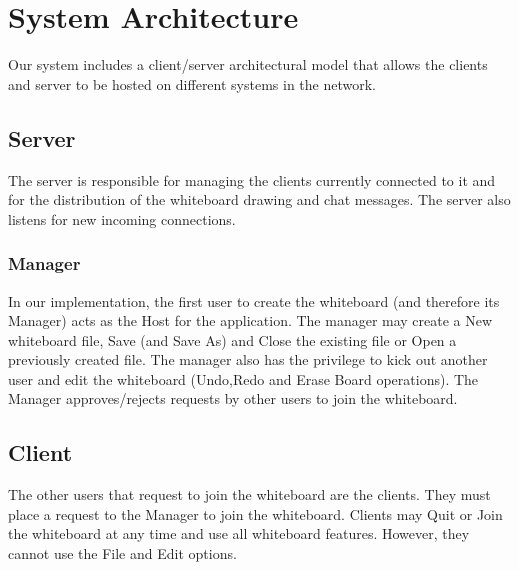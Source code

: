 \chapter{System Architecture}
Our system includes a client/server architectural model that allows the clients and server to be hosted on different systems in the network.
\section{Server}
The server is responsible for managing the clients currently connected to it and for the distribution of the whiteboard drawing and chat messages. The server also listens for new incoming connections.
\subsection{Manager}
In our implementation, the first user to create the whiteboard (and therefore its Manager) acts as the Host for the application. The manager may create a New whiteboard file, Save (and Save As) and Close the existing file or Open a previously created file. The manager also has the privilege to kick out another user and edit the whiteboard (Undo,Redo and Erase Board operations). The Manager approves/rejects requests by other users to join the whiteboard.
\section{Client}
The other users that request to join the whiteboard are the clients. They must place a request to the Manager to join the whiteboard. Clients may Quit or Join the whiteboard at any time and use all whiteboard features. However, they cannot use the File and Edit options.

